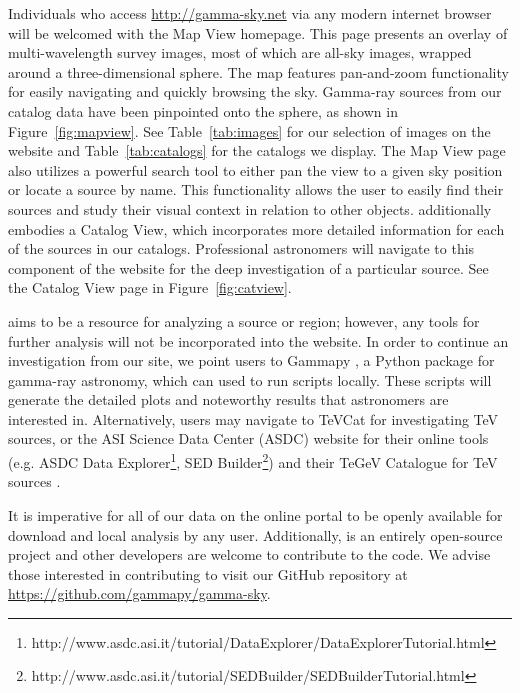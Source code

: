 Individuals who access \url{http://gamma-sky.net} via any modern internet browser will be welcomed with the Map View homepage. This page presents an overlay of multi-wavelength survey images, most of which are all-sky images, wrapped around a three-dimensional sphere. The map features pan-and-zoom functionality for easily navigating and quickly browsing the sky. Gamma-ray sources from our catalog data have been pinpointed onto the sphere, as shown in Figure~\ref{fig:mapview}. See Table~\ref{tab:images} for our selection of images on the website and Table~\ref{tab:catalogs} for the catalogs we display. The Map View page also utilizes a powerful search tool to either pan the view to a given sky position or locate a source by name. This functionality allows the user to easily find their sources and study their visual context in relation to other objects.  \gammasky additionally embodies a Catalog View, which incorporates more detailed information for each of the sources in our catalogs. Professional astronomers will navigate to this component of the website for the deep investigation of a particular source. See the Catalog View page in Figure~\ref{fig:catview}.





\gammasky aims to be a resource for analyzing a source or region; however, any tools for further analysis will not be incorporated into the website. In order to continue an investigation from our site, we point users to Gammapy \cite{gammapy}, a Python package for gamma-ray astronomy, which can used to run scripts locally. These scripts will generate the detailed plots and noteworthy results that astronomers are interested in. Alternatively, users may navigate to TeVCat \cite{tevcat} for investigating TeV sources, or the ASI Science Data Center (ASDC) website for their online tools (e.g. ASDC Data Explorer\footnote[1]{http://www.asdc.asi.it/tutorial/DataExplorer/DataExplorerTutorial.html}, SED Builder\footnote[2]{http://www.asdc.asi.it/tutorial/SEDBuilder/SEDBuilderTutorial.html}) and their TeGeV Catalogue for TeV sources \cite{tgevcat}.


It is imperative for all of our data on the online portal to be openly available for download and local analysis by any user. Additionally, \gammasky is an entirely open-source project and other developers are welcome to contribute to the code. We advise those interested in contributing to visit our GitHub repository at \url{https://github.com/gammapy/gamma-sky}.
